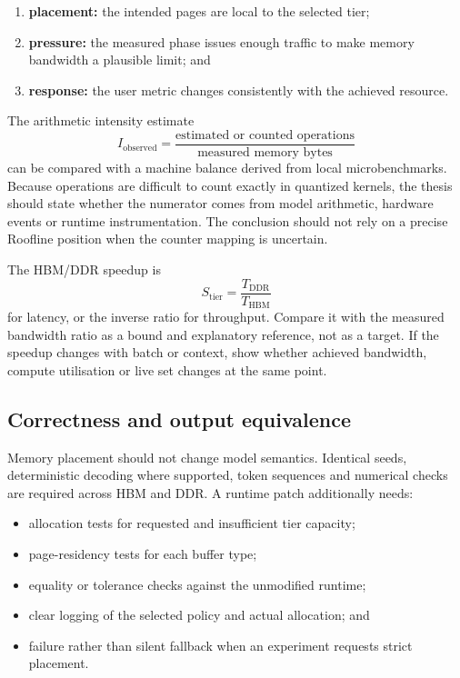 \begin{enumerate}
  \item \textbf{placement:} the intended pages are local to the selected
        tier;
  \item \textbf{pressure:} the measured phase issues enough traffic to
        make memory bandwidth a plausible limit; and
  \item \textbf{response:} the user metric changes consistently with
        the achieved resource.
\end{enumerate}

The arithmetic intensity estimate
\[
  I_{\mathrm{observed}} =
  \frac{\text{estimated or counted operations}}
       {\text{measured memory bytes}}
\]
can be compared with a machine balance derived from local
microbenchmarks.  Because operations are difficult to count exactly in
quantized kernels, the thesis should state whether the numerator comes
from model arithmetic, hardware events or runtime instrumentation.
The conclusion should not rely on a precise Roofline position when the
counter mapping is uncertain.

The HBM/DDR speedup is
\[
  S_{\mathrm{tier}} =
  \frac{T_{\mathrm{DDR}}}{T_{\mathrm{HBM}}}
\]
for latency, or the inverse ratio for throughput.  Compare it with the
measured bandwidth ratio as a bound and explanatory reference, not as
a target.  If the speedup changes with batch or context, show whether
achieved bandwidth, compute utilisation or live set changes at the same
point.

\subsection{Correctness and output equivalence}

Memory placement should not change model semantics.  Identical seeds,
deterministic decoding where supported, token sequences and numerical
checks are required across HBM and DDR.  A runtime patch additionally
needs:

\begin{itemize}
  \item allocation tests for requested and insufficient tier capacity;
  \item page-residency tests for each buffer type;
  \item equality or tolerance checks against the unmodified runtime;
  \item clear logging of the selected policy and actual allocation; and
  \item failure rather than silent fallback when an experiment requests
        strict placement.
\end{itemize}


